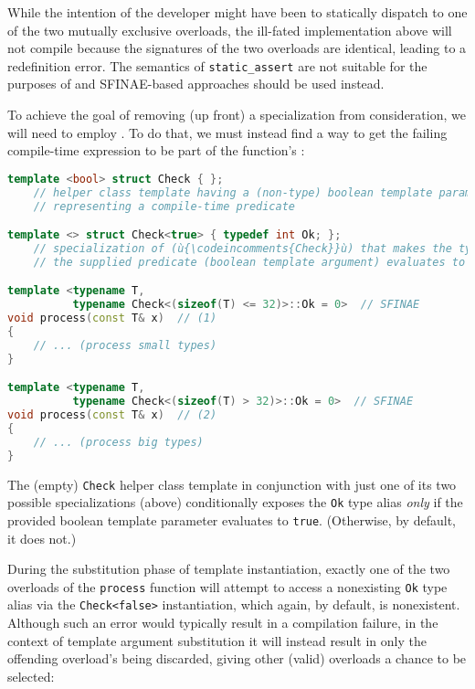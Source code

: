 \noindent While the intention of the developer might have been to statically
dispatch to one of the two mutually exclusive overloads, the ill-fated
implementation above will not compile because the signatures of the two
overloads are identical, leading to a redefinition error. The semantics
of \lstinline!static_assert! are not suitable for the purposes of
 and SFINAE-based approaches should be used instead.

To achieve the goal of removing (up
front) a specialization from consideration, we will need to employ
. To do that, we must instead find a way to get the
failing compile-time expression to be part of the function's
:

\begin{lstlisting}[language=C++]
template <bool> struct Check { };
    // helper class template having a (non-type) boolean template parameter
    // representing a compile-time predicate

template <> struct Check<true> { typedef int Ok; };
    // specialization of (ù{\codeincomments{Check}}ù) that makes the type (ù{\codeincomments{Ok}}ù) manifest *only* if
    // the supplied predicate (boolean template argument) evaluates to (ù{\codeincomments{true}}ù)

template <typename T,
          typename Check<(sizeof(T) <= 32)>::Ok = 0>  // SFINAE
void process(const T& x)  // (1)
{
    // ... (process small types)
}

template <typename T,
          typename Check<(sizeof(T) > 32)>::Ok = 0>  // SFINAE
void process(const T& x)  // (2)
{
    // ... (process big types)
}
\end{lstlisting}

\noindent The (empty) \lstinline!Check! helper class template in conjunction with
just one of its two possible specializations (above) conditionally
exposes the \lstinline!Ok! type alias \emph{only} if the provided boolean
template parameter evaluates to \lstinline!true!. (Otherwise, by default, it
does not.)

During the substitution phase of template instantiation,
exactly one of the two overloads of the \lstinline!process! function will
attempt to access a nonexisting \lstinline!Ok! type alias via the
\lstinline!Check<false>! instantiation, which again, by default, is
nonexistent. Although such an error would typically result in a
compilation failure, in the context of template argument substitution it
will instead result in only the offending overload's being discarded,
giving other (valid) overloads a chance to be selected:

